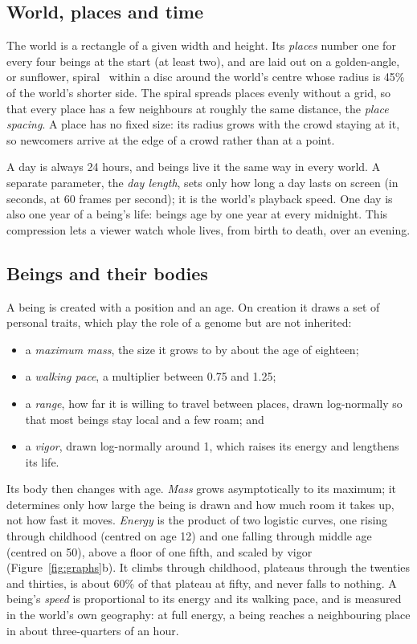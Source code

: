 \subsection{World, places and time}

The world is a rectangle of a given width and height. Its \emph{places} number one for every four beings at the start (at least two), and are laid out on a golden-angle, or sunflower, spiral~\cite{vogel1979} within a disc around the world's centre whose radius is 45\% of the world's shorter side. The spiral spreads places evenly without a grid, so that every place has a few neighbours at roughly the same distance, the \emph{place spacing}. A place has no fixed size: its radius grows with the crowd staying at it, so newcomers arrive at the edge of a crowd rather than at a point.

A day is always 24 hours, and beings live it the same way in every world. A separate parameter, the \emph{day length}, sets only how long a day lasts on screen (in seconds, at 60 frames per second); it is the world's playback speed. One day is also one year of a being's life: beings age by one year at every midnight. This compression lets a viewer watch whole lives, from birth to death, over an evening.

\subsection{Beings and their bodies}

A being is created with a position and an age. On creation it draws a set of personal traits, which play the role of a genome but are not inherited:
\begin{itemize}[leftmargin=1.5em, itemsep=0.1em]
  \item a \emph{maximum mass}, the size it grows to by about the age of eighteen;
  \item a \emph{walking pace}, a multiplier between 0.75 and 1.25;
  \item a \emph{range}, how far it is willing to travel between places, drawn log-normally so that most beings stay local and a few roam; and
  \item a \emph{vigor}, drawn log-normally around 1, which raises its energy and lengthens its life.
\end{itemize}
Its body then changes with age. \emph{Mass} grows asymptotically to its maximum; it determines only how large the being is drawn and how much room it takes up, not how fast it moves. \emph{Energy} is the product of two logistic curves, one rising through childhood (centred on age 12) and one falling through middle age (centred on 50), above a floor of one fifth, and scaled by vigor (Figure~\ref{fig:graphs}b). It climbs through childhood, plateaus through the twenties and thirties, is about 60\% of that plateau at fifty, and never falls to nothing. A being's \emph{speed} is proportional to its energy and its walking pace, and is measured in the world's own geography: at full energy, a being reaches a neighbouring place in about three-quarters of an hour.

